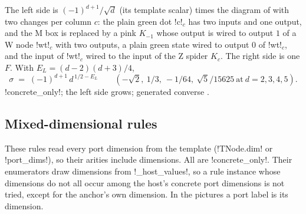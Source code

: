 The left side is $(-1)^{d+1}/\sqrt d$ (its template scalar) times the diagram of 
with two changes per column $c$: the plain green dot \code!c!$_c$ has two inputs and one output,
and the M box is replaced by a pink $K_{-1}$ whose output is wired to output $1$ of a W node
\code!wt!$_c$ with two outputs, a plain green state wired to output $0$ of \code!wt!$_c$, and the
input of \code!wt!$_c$ wired to the input of the Z spider $K_c$. The right side is one $F$. With
$E_L=(d-2)(d+3)/4$,
\[
\sigma\;=\;(-1)^{d+1}\,d^{\,1/2-E_L}\qquad(-\sqrt2,\ 1/3,\ -1/64,\ \sqrt5/15625\ \text{at}\ d=2,3,4,5).
\]
\py!concrete_only!; the left side grows; generated converse .

\subsection{Mixed-dimensional rules}\label{sec:completeness-mixed}

These rules read every port dimension from the template (\py!TNode.dim! or \py!port_dims!), so
their arities include dimensions. All are \py!concrete_only!. Their enumerators draw dimensions
from \py!_host_values!, so a rule instance whose dimensions do not all occur among the host's
concrete port dimensions is not tried, except for the anchor's own dimension. In the pictures a
port label is its dimension.

